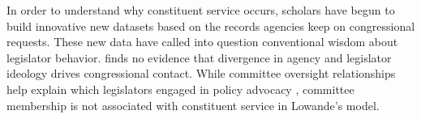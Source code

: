 \documentclass{article}
\begin{document}




In order to understand why constituent service occurs, scholars have begun to build innovative new datasets based on the records agencies keep on congressional requests. These new data have called into question conventional wisdom about legislator behavior. \citet{Lowande2018JOP} finds no evidence that divergence in agency and legislator ideology drives congressional contact. While committee oversight relationships help explain which legislators engaged in policy advocacy \citep{Ritchie2017, Lowande2018JOP}, committee membership is not associated with constituent service in Lowande's model.
\end{document}
